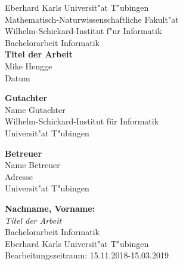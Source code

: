 \documentclass[twoside,12pt,a4paper]{report}
\begin{document}
 
\begin{titlepage}
 \begin{center}
  {\LARGE Eberhard Karls Universit"at T"ubingen}\\
  {\large Mathematisch-Naturwissenschaftliche Fakult"at \\
Wilhelm-Schickard-Institut f"ur Informatik\\[4cm]}
  {\huge Bachelorarbeit Informatik\\[2cm]}
  {\Large\bf  Titel der Arbeit\\[1.5cm]}
 {\large Mike Hengge}\\[0.5cm]
Datum\\[3cm]
\begin{center}{\small\bf Gutachter}\\[0.5cm]
{\large Name Gutachter}\\
  {\footnotesize Wilhelm-Schickard-Institut f\"ur Informatik\\
  Universit"at T"ubingen} \end{center}
  
  
\begin{center}
{\small\bf Betreuer}\\[0.5cm]
{\large Name Betreuer}\\
  {\footnotesize Adresse\\
  Universit"at T"ubingen}\end{center}

   \end{center}
\end{titlepage}


\thispagestyle{empty}
\vspace*{\fill}
\begin{minipage}{11.2cm}
\textbf{Nachname, Vorname:}\\
\emph{Titel der Arbeit}\\ Bachelorarbeit Informatik\\
Eberhard Karls Universit"at T"ubingen\\
Bearbeitungszeitraum: 15.11.2018-15.03.2019
\end{minipage}
\newpage
\end{document}
